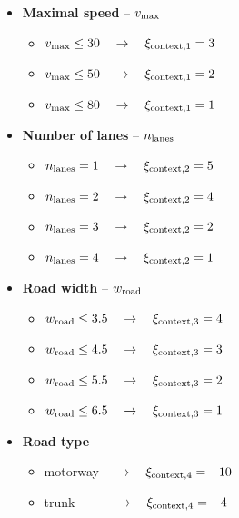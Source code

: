             \begin{itemize}
                \item \textbf{Maximal speed} -- $v_{\rm{max}}$
                    \begin{itemize}
                        \item $v_{\rm{max}}\leq30\quad\to\quad\xi_{\rm{context,1}}=3$
                        \item $v_{\rm{max}}\leq50\quad\to\quad\xi_{\rm{context,1}}=2$
                        \item $v_{\rm{max}}\leq80\quad\to\quad\xi_{\rm{context,1}}=1$
                    \end{itemize}
                \item \textbf{Number of lanes} -- $n_{\rm{lanes}}$
                    \begin{itemize}
                        \item $n_{\rm{lanes}}=1\quad\to\quad\xi_{\rm{context,2}}=5$
                        \item $n_{\rm{lanes}}=2\quad\to\quad\xi_{\rm{context,2}}=4$
                        \item $n_{\rm{lanes}}=3\quad\to\quad\xi_{\rm{context,2}}=2$
                        \item $n_{\rm{lanes}}=4\quad\to\quad\xi_{\rm{context,2}}=1$
                    \end{itemize}
                \item \textbf{Road width} -- $w_{\rm{road}}$
                    \begin{itemize}
                        \item $w_{\rm{road}}\leq3.5\quad\to\quad\xi_{\rm{context,3}}=4$
                        \item $w_{\rm{road}}\leq4.5\quad\to\quad\xi_{\rm{context,3}}=3$
                        \item $w_{\rm{road}}\leq5.5\quad\to\quad\xi_{\rm{context,3}}=2$
                        \item $w_{\rm{road}}\leq6.5\quad\to\quad\xi_{\rm{context,3}}=1$
                    \end{itemize}
                \item \textbf{Road type}
                    \begin{itemize}
                        \item motorway $\quad\to\quad\xi_{\rm{context,4}}=-10$
                        \item trunk $\quad\qquad\to\quad\xi_{\rm{context,4}}=-4$

\end{itemize}
\end{itemize}
